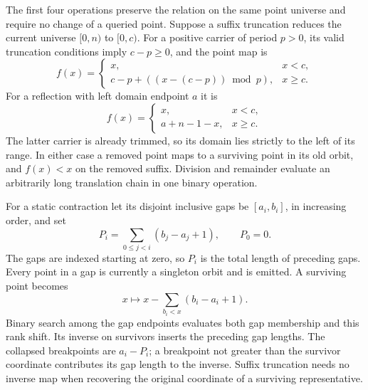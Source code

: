 The first four operations preserve the relation on the same point universe
and require no change of a queried point.  Suppose a suffix truncation reduces
the current universe $[0,n)$ to $[0,c)$.  For a positive carrier of period
$p>0$, its valid truncation conditions imply $c-p\ge0$, and the point map is
\[
 f(x)=\begin{cases}
 x,&x<c,\\
 c-p+((x-(c-p))\bmod p),&x\ge c.
 \end{cases}
\]
For a reflection with left domain endpoint $a$ it is
\[
 f(x)=\begin{cases}x,&x<c,\\a+n-1-x,&x\ge c.\end{cases}
\]
The latter carrier is already trimmed, so its domain lies strictly to the
left of its range.  In either case a removed point maps to a surviving point
in its old orbit, and $f(x)<x$ on the removed suffix.  Division and remainder
evaluate an arbitrarily long translation chain in one binary operation.

For a static contraction let its disjoint inclusive gaps be
$[a_i,b_i]$, in increasing order, and set
\[
 P_i=\sum_{0\le j<i}(b_j-a_j+1),\qquad P_0=0.
\]
The gaps are indexed starting at zero, so $P_i$ is the total length of
preceding gaps. Every point in a gap is currently a
singleton orbit and is emitted.  A surviving point becomes
\[
 x\longmapsto x-\sum_{b_i<x}(b_i-a_i+1).
\]
Binary search among the gap endpoints evaluates both gap membership and
this rank shift.  Its inverse on survivors inserts the preceding gap
lengths.  The collapsed breakpoints are $a_i-P_i$; a breakpoint not greater
than the survivor coordinate contributes its gap length to the inverse.
Suffix truncation needs no inverse map when recovering the original
coordinate of a surviving representative.

